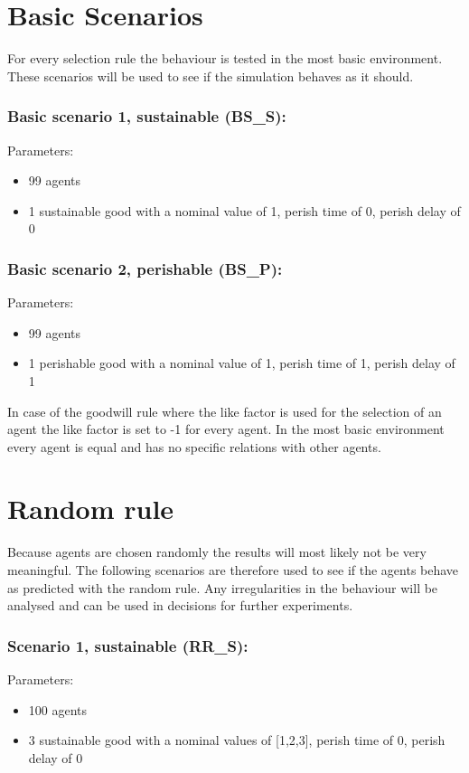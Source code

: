 \documentclass[twoside,openright]{uva-bachelor-thesis}
\begin{document}
\section{Basic Scenarios}
For every selection rule the behaviour is tested in the most basic environment. These scenarios will be used to see if the simulation behaves as it should.
\subsubsection{Basic scenario 1, sustainable (BS\_S):}
Parameters:
\begin{itemize}
\item	99 agents
\item	1 sustainable good with a nominal value of 1, perish time of 0, perish delay of 0
\end{itemize}
\subsubsection{Basic scenario 2, perishable (BS\_P):}
Parameters:
\begin{itemize}
\item	99 agents
\item	1 perishable good with a nominal value of 1, perish time of 1, perish delay of 1
\end{itemize}
In case of the goodwill rule where the like factor is used for the selection of an agent the like factor is set to -1 for every agent. In the most basic environment every agent is equal and has no specific relations with other agents.

\section{Random rule}
Because agents are chosen randomly the results will most likely not be very meaningful. The following scenarios are therefore used to see if the agents behave as predicted with the random rule.  Any irregularities in the behaviour will be analysed and can be used in decisions for further experiments.
\subsubsection{Scenario 1, sustainable (RR\_S):}
Parameters:
\begin{itemize}
\item	100 agents
\item	3 sustainable good with a nominal values of [1,2,3], perish time of 0, perish delay of 0
\end{itemize}
\end{document}
